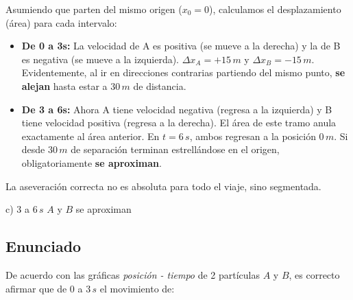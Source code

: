\documentclass[12pt, a4paper]{article}
\begin{document}
Asumiendo que parten del mismo origen ($x_0 = 0$), calculamos el desplazamiento (área) para cada intervalo:
\begin{itemize}
    \item \textbf{De 0 a 3s:} La velocidad de A es positiva (se mueve a la derecha) y la de B es negativa (se mueve a la izquierda). $\Delta x_A = +15\,\si{m}$ y $\Delta x_B = -15\,\si{m}$. Evidentemente, al ir en direcciones contrarias partiendo del mismo punto, \textbf{se alejan} hasta estar a $30\,\si{m}$ de distancia.
    \item \textbf{De 3 a 6s:} Ahora A tiene velocidad negativa (regresa a la izquierda) y B tiene velocidad positiva (regresa a la derecha). El área de este tramo anula exactamente al área anterior. En $t=6\,\si{s}$, ambos regresan a la posición $0\,\si{m}$. Si desde $30\,\si{m}$ de separación terminan estrellándose en el origen, obligatoriamente \textbf{se aproximan}.
\end{itemize}

La aseveración correcta no es absoluta para todo el viaje, sino segmentada. 

\begin{tcolorbox}[colback=green!5!white, colframe=green!50!black, title=Respuesta Final]
\centering \Large c) $3$ a $6\,\si{s}$ $A$ y $B$ se aproximan
\end{tcolorbox}

\newpage

\subsection*{Enunciado}
De acuerdo con las gráficas \textit{posición - tiempo} de 2 partículas $A$ y $B$, es correcto afirmar que de $0$ a $3\,\si{s}$ el movimiento de:

\begin{center}
\end{center}
\end{document}
